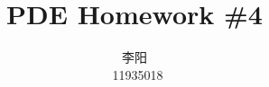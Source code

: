 \documentclass[10pt,a4paper]{article}
\title{PDE Homework \#4}
\author{\begin{CJK*}{UTF8}{gkai}
    李阳
    \end{CJK*}\, 11935018}
\begin{document}
\maketitle

\renewcommand\theenumi{\roman{enumi}}
\renewcommand\labelenumi{(\theenumi)}










\end{document}
